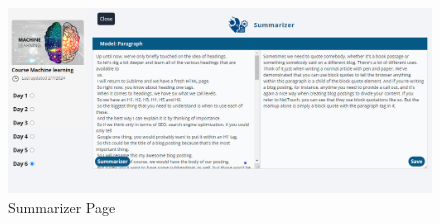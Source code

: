 \begin{figure}[h!]
	\centering
	\includegraphics[max height=\textheight,max width=\textwidth]{figures/frontend/summarizer.png}
	\caption{Summarizer Page}
\end{figure}